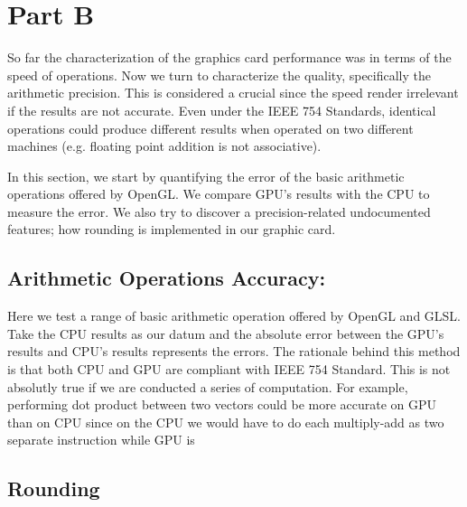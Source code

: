 \section{Part B}
So far the characterization of the graphics card performance was in terms of the speed of operations. Now we turn to characterize the quality, specifically the arithmetic precision. This is considered a crucial since the speed render irrelevant if the results are not accurate. Even under the IEEE 754 Standards, identical operations could produce different results when operated on two different machines (e.g. floating point addition is not associative). 

In this section, we start by quantifying the error of the basic arithmetic operations offered by OpenGL. We compare GPU's results with the CPU to measure the error. We also try to discover a precision-related undocumented features; how rounding is implemented in our graphic card. 

\subsection{Arithmetic Operations Accuracy:}
Here we test a range of basic arithmetic operation offered by OpenGL and GLSL. Take the CPU results as our datum and the absolute error between the GPU's results and CPU's results represents the errors. The rationale behind this method is that both CPU and GPU are compliant with IEEE 754 Standard. This is not absolutly true if we are conducted a series of computation. For example, performing dot product between two vectors could be more accurate on GPU than on CPU \cite{whitehead2011precision} since on the CPU we would have to do each multiply-add as two separate instruction while GPU is 


\subsection{Rounding}



